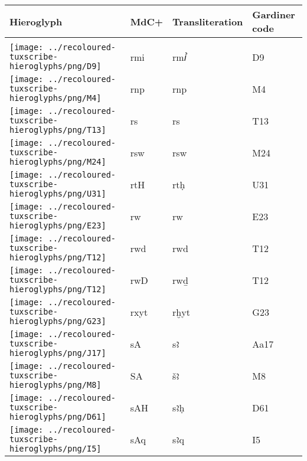\begin{center}
	\begin{tabularx}{\linewidth}{YYYY}
		Hieroglyph & MdC+ & Transliteration & Gardiner code\\
		\hline\\
		\texttt{[image: ../recoloured-tuxscribe-hieroglyphs/png/D9]} & rmi & rmꞽ & D9 \\ 
		\texttt{[image: ../recoloured-tuxscribe-hieroglyphs/png/M4]} & rnp & rnp & M4 \\ 
		\texttt{[image: ../recoloured-tuxscribe-hieroglyphs/png/T13]} & rs & rs & T13 \\ 
		\texttt{[image: ../recoloured-tuxscribe-hieroglyphs/png/M24]} & rsw & rsw & M24 \\ 
		\texttt{[image: ../recoloured-tuxscribe-hieroglyphs/png/U31]} & rtH & rtḥ & U31 \\ 
		\vspace{0.30000cm} \texttt{[image: ../recoloured-tuxscribe-hieroglyphs/png/E23]} \vspace{0.30000cm} & rw & rw & E23 \\ 
		\texttt{[image: ../recoloured-tuxscribe-hieroglyphs/png/T12]} & rwd & rwd & T12 \\ 
		\texttt{[image: ../recoloured-tuxscribe-hieroglyphs/png/T12]} & rwD & rwḏ & T12 \\ 
		\texttt{[image: ../recoloured-tuxscribe-hieroglyphs/png/G23]} & rxyt & rḫyt & G23 \\ 
		\texttt{[image: ../recoloured-tuxscribe-hieroglyphs/png/J17]} & sA & sꜣ & Aa17 \\ 
		\texttt{[image: ../recoloured-tuxscribe-hieroglyphs/png/M8]} & SA & šꜣ & M8 \\ 
		\texttt{[image: ../recoloured-tuxscribe-hieroglyphs/png/D61]} & sAH & sꜣḥ & D61 \\ 
		\texttt{[image: ../recoloured-tuxscribe-hieroglyphs/png/I5]} & sAq & sꜣq & I5 \\ 
	\end{tabularx}
\end{center}


